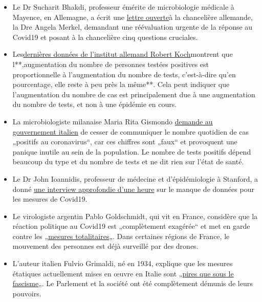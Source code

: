 \begin{itemize}
\tightlist
\item
  Le Dr Sucharit Bhakdi, professeur émérite de microbiologie médicale à
  Mayence, en Allemagne, a écrit une
  \href{https://swprs.org/open-letter-from-professor-sucharit-bhakdi-to-german-chancellor-dr-angela-merkel/}{lettre
  ouverte}à la chancelière allemande, la Dre Angela Merkel, demandant
  une réévaluation urgente de la réponse au Covid19 et posant à la
  chancelière cinq questions cruciales.
\item
  Les\href{https://multipolar-magazin.de/artikel/coronavirus-irrefuhrung-fallzahlen}{dernières
  données de l'institut allemand Robert Koch}montrent que
  l**‚augmentation du nombre de personnes testées positives est
  proportionnelle à l'augmentation du nombre de tests, c'est-à-dire
  qu'en pourcentage, elle reste à peu près la même**. Cela peut indiquer
  que l'augmentation du nombre de cas est principalement due à une
  augmentation du nombre de tests, et non à une épidémie en cours.
\item
  La microbiologiste milanaise Maria Rita Gismondo
  \href{https://www.secoloditalia.it/2020/03/coronavirus-la-gismondo-ammonisce-duramente-basta-snocciolare-numeri-sui-positivi-sono-dati-falsati/}{demande
  au gouvernement italien} de cesser de communiquer le nombre quotidien
  de cas „positifs au coronavirus``, car ces chiffres sont „faux`` et
  provoquent une panique inutile au sein de la population. Le nombre de
  tests positifs dépend beaucoup du type et du nombre de tests et ne dit
  rien sur l'état de santé.
\item
  Le Dr John Ioannidis, professeur de médecine et d'épidémiologie à
  Stanford, a donné
  \href{https://www.youtube.com/watch?v=d6MZy-2fcBw}{une interview
  approfondie d'une heure} sur le manque de données pour les mesures de
  Covid19.
\item
  Le virologiste argentin Pablo Goldschmidt, qui vit en France,
  considère que la réaction politique au Covid19 est „complètement
  exagérée`` et met en garde contre les
  „\href{https://www.infobae.com/coronavirus/2020/03/28/para-un-prestigioso-cientifico-argentino-el-coronavirus-no-merece-que-el-planeta-este-en-un-estado-de-parate-total/}{mesures
  totalitaires}„. Dans certaines régions de France, le mouvement des
  personnes est déjà surveillé par des drones.
\item
  L'auteur italien Fulvio Grimaldi, né en 1934, explique que les mesures
  étatiques actuellement mises en œuvre en Italie sont
  „\href{https://www.youtube.com/watch?v=O3BuNp01vpc}{pires que sous le
  fascisme}„. Le Parlement et la société ont été complètement démunis de
  leurs pouvoirs.
\end{itemize}

